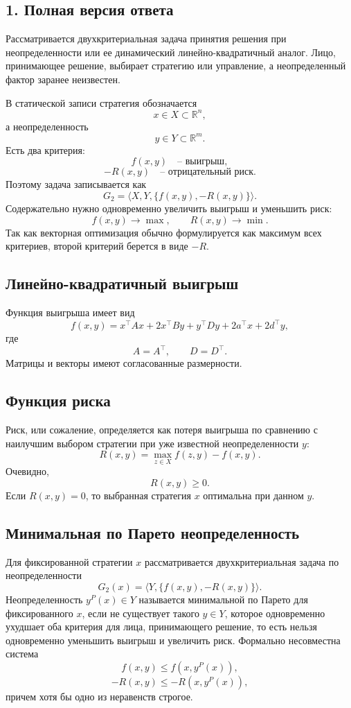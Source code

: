 \documentclass[12pt,a4paper]{article}
\newcommand{\R}{\mathbb{R}}
\newcommand{\fullanswer}{\subsection*{1. Полная версия ответа}}
\begin{document}
\fullanswer
Рассматривается двухкритериальная задача принятия решения при неопределенности или ее динамический линейно-квадратичный аналог. Лицо, принимающее решение, выбирает стратегию или управление, а неопределенный фактор заранее неизвестен.

В статической записи стратегия обозначается
\[
x\in X\subset\R^n,
\]
а неопределенность
\[
y\in Y\subset\R^m.
\]
Есть два критерия:
\[
f(x,y)\quad \text{-- выигрыш},
\]
\[
-R(x,y)\quad \text{-- отрицательный риск}.
\]
Поэтому задача записывается как
\[
G_2=\langle X,Y,\{f(x,y),-R(x,y)\}\rangle.
\]
Содержательно нужно одновременно увеличить выигрыш и уменьшить риск:
\[
f(x,y)\to\max,
\qquad
R(x,y)\to\min.
\]
Так как векторная оптимизация обычно формулируется как максимум всех критериев, второй критерий берется в виде \(-R\).

\subsection*{Линейно-квадратичный выигрыш}
Функция выигрыша имеет вид
\[
f(x,y)=x^{\top}Ax+2x^{\top}By+y^{\top}Dy+2a^{\top}x+2d^{\top}y,
\]
где
\[
A=A^{\top},
\qquad
D=D^{\top}.
\]
Матрицы и векторы имеют согласованные размерности.

\subsection*{Функция риска}
Риск, или сожаление, определяется как потеря выигрыша по сравнению с наилучшим выбором стратегии при уже известной неопределенности \(y\):
\[
R(x,y)=\max_{z\in X}f(z,y)-f(x,y).
\]
Очевидно,
\[
R(x,y)\ge 0.
\]
Если \(R(x,y)=0\), то выбранная стратегия \(x\) оптимальна при данном \(y\).

\subsection*{Минимальная по Парето неопределенность}
Для фиксированной стратегии \(x\) рассматривается двухкритериальная задача по неопределенности
\[
G_2(x)=\langle Y,\{f(x,y),-R(x,y)\}\rangle.
\]
Неопределенность \(y^P(x)\in Y\) называется минимальной по Парето для фиксированного \(x\), если не существует такого \(y\in Y\), которое одновременно ухудшает оба критерия для лица, принимающего решение, то есть нельзя одновременно уменьшить выигрыш и увеличить риск. Формально несовместна система
\[
f(x,y)\le f(x,y^P(x)),
\]
\[
-R(x,y)\le -R(x,y^P(x)),
\]
причем хотя бы одно из неравенств строгое.
\end{document}
